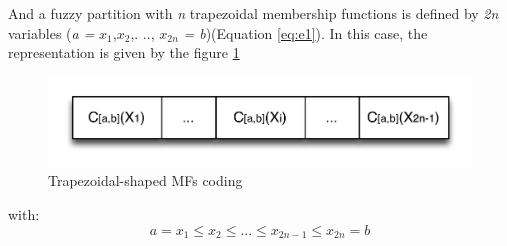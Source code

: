 \documentclass[conference]{IEEEtran}
\begin{document}


% 
And a fuzzy partition with \textit{n} trapezoidal membership functions
is defined by \textit{2n} variables (\textit{a =} $ x_{1}$,$x_{2}
$,. .., $x_{2n} $ \textit {= b})(Equation \ref{eq:e1}). In this case,
the representation is given by the
figure \ref{fig:at} 
\begin{figure}[!ht] 
	\begin{center}
		\includegraphics[scale=0.55]{fig/trapezoidal.png}
		\caption {Trapezoidal-shaped MFs coding}
		\label{fig:at}
	\end{center}
\end{figure}
with:
\begin{equation}
a = x_{1} \leq x_{2} \leq...\leq x_{2n-1} \leq x_{2n}=b 	
\end{equation}		
\end{document}
